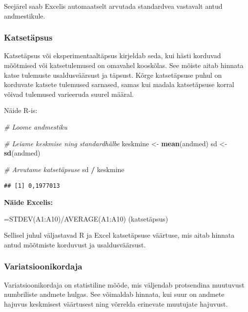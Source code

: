 \documentclass[
]{book}
\newenvironment{Shaded}{\begin{snugshade}}{\end{snugshade}}
\newcommand{\CommentTok}[1]{\textcolor[rgb]{0.56,0.35,0.01}{\textit{#1}}}
\newcommand{\FunctionTok}[1]{\textcolor[rgb]{0.13,0.29,0.53}{\textbf{#1}}}
\newcommand{\NormalTok}[1]{#1}
\newcommand{\OtherTok}[1]{\textcolor[rgb]{0.56,0.35,0.01}{#1}}
\newcommand{\SpecialCharTok}[1]{\textcolor[rgb]{0.81,0.36,0.00}{\textbf{#1}}}
\renewenvironment{Shaded} {\begin{snugshade}\footnotesize} {\end{snugshade}}
\begin{document}
Seejärel saab Excelis automaatselt arvutada standardvea vastavalt antud andmestikule.

\subsubsection{Katsetäpsus}\label{katsetuxe4psus}

Katsetäpsus või eksperimentaaltäpsus kirjeldab seda, kui hästi korduvad mõõtmised või katsetulemused on omavahel kooskõlas. See mõiste aitab hinnata katse tulemuste usaldusväärsust ja täpsust. Kõrge katsetäpsuse puhul on korduvate katsete tulemused sarnased, samas kui madala katsetäpsuse korral võivad tulemused varieeruda suurel määral.

Näide R-is:

\begin{Shaded}
\begin{Highlighting}[]
\CommentTok{\# Loome andmestiku}

\CommentTok{\# Leiame keskmise ning standardhälbe}
\NormalTok{keskmine }\OtherTok{\textless{}{-}} \FunctionTok{mean}\NormalTok{(andmed)}
\NormalTok{sd }\OtherTok{\textless{}{-}} \FunctionTok{sd}\NormalTok{(andmed)}

\CommentTok{\# Arvutame katsetäpsuse}
\NormalTok{sd }\SpecialCharTok{/}\NormalTok{ keskmine}
\end{Highlighting}
\end{Shaded}

\begin{verbatim}
## [1] 0,1977013
\end{verbatim}

\textbf{Näide Excelis:}

\begin{Shaded}
\begin{Highlighting}[]
\NormalTok{\textasciigrave{}=STDEV(A1:A10)/AVERAGE(A1:A10)\textasciigrave{} (katsetäpsus)}
\end{Highlighting}
\end{Shaded}

Sellisel juhul väljastavad R ja Excel katsetäpsuse väärtuse, mis aitab hinnata antud mõõtmiste korduvust ja usaldusväärsust.

\subsubsection{Variatsioonikordaja}\label{variatsioonikordaja}

Variatsioonikordaja on statistiline mõõde, mis väljendab protsendina muutuvust numbriliste andmete hulgas. See võimaldab hinnata, kui suur on andmete hajuvus keskmisest väärtusest ning võrrelda erinevate muutujate hajuvust.
\end{document}
